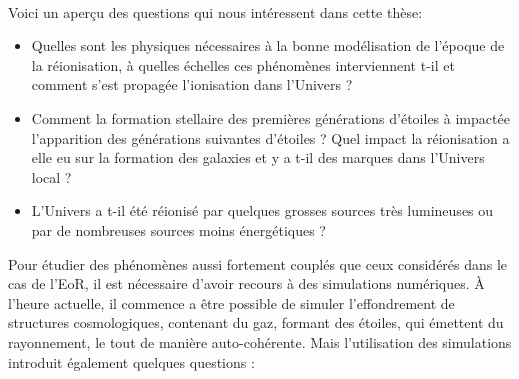 %


\paragraph{}
Voici un aperçu des questions qui nous intéressent dans cette thèse: 

\begin{itemize}
\item Quelles sont les physiques nécessaires à la bonne modélisation de l'époque de la réionisation, à quelles échelles ces phénomènes interviennent t-il et comment s'est propagée l'ionisation dans l'Univers ?
\item Comment la formation stellaire des premières générations d'étoiles à impactée l'apparition des générations suivantes d'étoiles ? %
Quel impact la réionisation a elle eu sur la formation des galaxies et y a t-il des marques dans l'Univers local ?
\item L'Univers a t-il été réionisé par quelques grosses sources très lumineuses ou par de nombreuses sources moins énergétiques ?
\end{itemize}

Pour étudier des phénomènes aussi fortement couplés que ceux considérés dans le cas de l'\ac{EoR}, il est nécessaire d'avoir recours à des simulations numériques. 
À l'heure actuelle, il commence a être possible de simuler l'effondrement de structures cosmologiques, contenant du gaz, formant des étoiles, qui émettent du rayonnement, le tout de manière auto-cohérente.
Mais l'utilisation des simulations introduit également quelques questions : 

